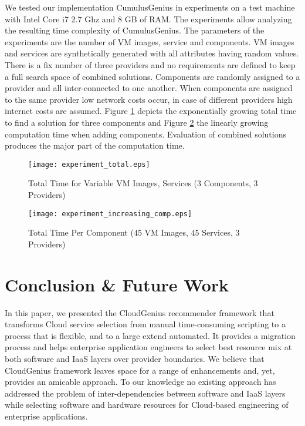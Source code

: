 \documentclass[10pt]{article}
\begin{document}
We tested our implementation CumulusGenius in experiments on a test machine with Intel Core i7 2.7 Ghz and 8 GB of RAM. The experiments allow analyzing the resulting time complexity of CumulusGenius. The parameters of the experiments are the number of VM images, service and components. VM images and services are synthetically generated with all attributes having random values. There is a fix number of three providers and no requirements are defined to keep a full search space of combined solutions. Components are randomly assigned to a provider and all inter-connected to one another. When components are assigned to the same provider low network costs occur, in case of different providers high internet costs are assumed. Figure \ref{experiments_total} depicts the exponentially growing total time to find a solution for three components and Figure \ref{experiments_incr_comp} the linearly growing computation time when adding components. Evaluation of combined solutions produces the major part of the computation time.

\begin{figure}[h]
\centering
\texttt{[image: experiment\_total.eps]} 
\caption{Total Time for Variable VM Images, Services (3 Components, 3 Providers)}\label{experiments_total}
\end{figure}

\begin{figure}[h]
\centering
\texttt{[image: experiment\_increasing\_comp.eps]} 
\caption{Total Time Per Component (45 VM Images, 45 Services, 3 Providers)}\label{experiments_incr_comp}
\end{figure}

\section{Conclusion \& Future Work}\label{discussion-future}

In this paper, we presented the CloudGenius recommender framework that transforms Cloud service selection from manual time-consuming scripting to a process that is flexible, and to a large extend automated. It provides a migration process and helps enterprise application engineers to select best resource mix at both software and IaaS layers over provider boundaries. We believe that CloudGenius framework leaves space for a range of enhancements and, yet, provides an amicable approach. To our knowledge no existing approach has addressed the problem of inter-dependencies between software and IaaS layers while selecting software and hardware resources for Cloud-based engineering of enterprise applications.  
\end{document}
